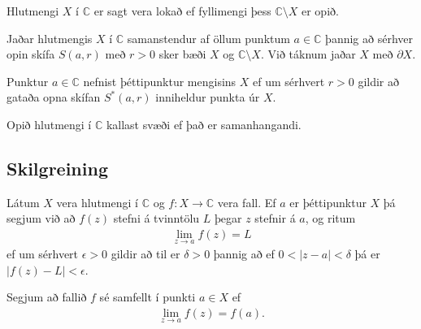 \documentclass[a4paper,10pt,icelandic]{sphinxmanual}
\begin{document}
Hlutmengi \(X\) í \({\mathbb{C}}\) er sagt vera lokað ef fyllimengi þess
\({\mathbb{C}}\setminus X\) er opið.

Jaðar hlutmengis \(X\) í \({\mathbb{C}}\) samanstendur af öllum punktum
\(a\in {\mathbb{C}}\) þannig að sérhver opin skífa \(S(a,r)\) með
\(r>0\) sker bæði \(X\) og \({\mathbb{C}}\setminus X\). Við táknum
jaðar \(X\) með \(\partial X\).

Punktur \(a\in {\mathbb{C}}\) nefnist þéttipunktur mengisins \(X\) ef um
sérhvert \(r>0\) gildir að gataða opna skífan \(S^*(a,r)\)
inniheldur punkta úr \(X\).

Opið hlutmengi í \({\mathbb{C}}\) kallast svæði ef það er samanhangandi.


\subsection{Skilgreining}
\label{\detokenize{Kafli02:id1}}
Látum \(X\) vera hlutmengi í \({\mathbb{C}}\) og
\(f:X\rightarrow {\mathbb{C}}\) vera fall. Ef \(a\) er þéttipunktur
\(X\) þá segjum við að \(f(z)\) stefni á tvinntölu \(L\)
þegar \(z\) stefnir á \(a\), og ritum
\begin{equation*}
\begin{split}\lim_{z\rightarrow a} f(z)=L\end{split}
\end{equation*}
ef um sérhvert \(\epsilon>0\) gildir að til er \(\delta >0\)
þannig að ef \(0<|z-a|<\delta\) þá er \(|f(z)-L|<\epsilon\).

Segjum að fallið \(f\) sé samfellt í punkti \(a\in X\) ef
\begin{equation*}
\begin{split}\lim_{z\rightarrow a} f(z)=f(a).\end{split}
\end{equation*}
\end{document}
